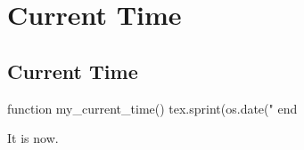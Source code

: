 \chapter{Current Time}
\section{Current Time}
\begin{luacode*}
  function my_current_time()
  tex.sprint(os.date("%
  end
\end{luacode*}
\newcommand*{\myCurrentTime}{%
}
It is {\myCurrentTime} now.
